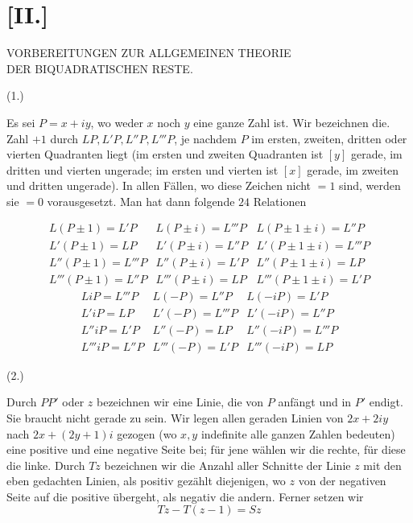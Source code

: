 %
\section*{[II.]}
\begin{center}VORBEREITUNGEN ZUR ALLGEMEINEN THEORIE\\DER BIQUADRATISCHEN RESTE.\end{center}
\par\medskip{}\centerline{(1.)}\smallskip
Es sei $P=x+iy$, wo weder $x$ noch $y$ eine ganze Zahl ist. Wir bezeichnen die. Zahl $+1$ durch $LP,L'P,L''P,L'''P$, je nachdem $P$ im ersten, zweiten, dritten oder vierten Quadranten liegt (im ersten und zweiten Quadranten ist $[y]$ gerade, im dritten und vierten ungerade; im ersten und vierten ist $[x]$ gerade, im zweiten und dritten ungerade). In allen Fällen, wo diese Zeichen nicht $=1$ sind, werden sie $=0$ vorausgesetzt. Man hat dann folgende $24$ Relationen

\[
\begin{array}{lll}
L(P\pm1)=L'P&L(P\pm i)=L'''P&L(P\pm1\pm i)=L''P\\
L'(P\pm1)=LP&L'(P\pm i)=L''P&L'(P\pm1\pm i)=L'''P\\
L''(P\pm1)=L'''P&L''(P\pm i)=L'P&L''(P\pm1\pm i)=LP\\
L'''(P\pm1)=L''P&L'''(P\pm i)=LP&L'''(P\pm1\pm i)=L'P
\end{array}
\]
\[
\begin{array}{lll}
LiP=L'''P&L(-P)=L''P&L(-iP)=L'P\\
L'iP=LP&L'(-P)=L'''P&L'(-iP)=L''P\\
L''iP=L'P&L''(-P)=LP&L''(-iP)=L'''P\\
L'''iP=L''P&L'''(-P)=L'P&L'''(-iP)=LP
\end{array}
\]

\par\medskip{}\centerline{(2.)}\smallskip
Durch $PP'$ oder $z$ bezeichnen wir eine Linie, die von $P$ anfängt und in $P'$ endigt. Sie braucht nicht gerade zu sein. Wir legen allen geraden Linien von $2x+2iy$ nach $2x+(2y+1)i$ gezogen (wo $x,y$ indefinite alle ganzen Zahlen bedeuten) eine positive und eine negative Seite bei; für jene wählen wir die rechte, für diese die linke. Durch $Tz$ bezeichnen wir die Anzahl aller Schnitte
%
der Linie $z$ mit den eben gedachten Linien, als positiv gezählt diejenigen, wo $z$ von der negativen Seite auf die positive übergeht, als negativ die andern. Ferner setzen wir
\[
Tz-T(z-1)=Sz
\]

